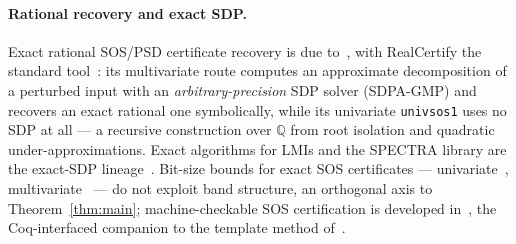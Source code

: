\documentclass[11pt]{article}
\theoremstyle{definition}
\theoremstyle{remark}
\newcommand{\Q}{\mathbb{Q}}
\renewcommand{\_}{\ifdim\fontdimen3\font=0pt\relax\char`\_\else\textunderscore\fi\hspace{0pt}}
\begin{document}
\paragraph{Rational recovery and exact SDP.} Exact rational SOS/PSD
certificate recovery is due to~\cite{peyrl2008,kaltofen2012}, with
RealCertify the standard tool~\cite{magron2018realcertify}: its multivariate
route computes an approximate decomposition of a perturbed input with an
\emph{arbitrary-precision} SDP solver (SDPA-GMP) and recovers an exact
rational one symbolically, while its univariate \texttt{univsos1} uses no SDP
at all --- a recursive construction over $\Q$ from root isolation and
quadratic under-approximations. Exact algorithms for LMIs and the SPECTRA
library are the exact-SDP lineage~\cite{henrion2019spectra}. Bit-size bounds
for exact SOS certificates --- univariate~\cite{magron2018},
multivariate~\cite{magron2021multivariate,davispapp2023} --- do not exploit
band structure, an orthogonal axis to Theorem~\ref{thm:main};
machine-checkable SOS certification is developed in~\cite{magron2015formal},
the Coq-interfaced companion to the template method of~\cite{allamigeon2014}.
\end{document}
